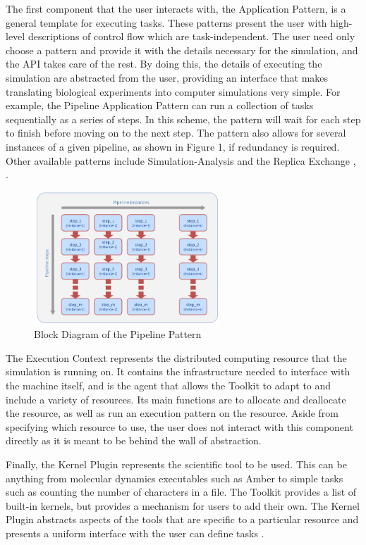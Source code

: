 \documentclass[]{article}
\begin{document}
			The first component that the user interacts with, the Application Pattern, is a general template for executing tasks. These patterns present the user with high-level descriptions of control flow which are task-independent. The user need only choose a pattern and provide it with the details necessary for the simulation, and the API takes care of the rest. By doing this, the details of executing the simulation are abstracted from the user, providing an interface that makes translating biological experiments into computer simulations very simple. For example, the Pipeline Application Pattern can run a collection of tasks sequentially as a series of steps. In this scheme, the pattern will wait for each step to finish before moving on to the next step. The pattern also allows for several instances of a given pipeline, as shown in Figure 1, if redundancy is required. Other available patterns include Simulation-Analysis and the Replica Exchange \cite{enmd_paper}, \cite{repex_paper}.

			\begin{figure}[H]
				\centering
				\includegraphics[width=7cm,height=5cm]{diagrams/pipeline_pattern}
				\caption{Block Diagram of the Pipeline Pattern \cite{pipeline_pattern}}
				\label{fig:pipeline_block_diagram}
			\end{figure}

			The Execution Context represents the distributed computing resource that the simulation is running on. It contains the infrastructure needed to interface with the machine itself, and is the agent that allows the Toolkit to adapt to and include a variety of resources. Its main functions are to allocate and deallocate the resource, as well as run an execution pattern on the resource. Aside from specifying which resource to use, the user does not interact with this component directly as it is meant to be behind the wall of abstraction. 

			Finally, the Kernel Plugin represents the scientific tool to be used. This can be anything from molecular dynamics executables such as Amber to simple tasks such as counting the number of characters in a file. The Toolkit provides a list of built-in kernels, but provides a mechanism for users to add their own. The Kernel Plugin abstracts aspects of the tools that are specific to a particular resource and presents a uniform interface with the user can define tasks \cite{enmd_paper}.
\end{document}
